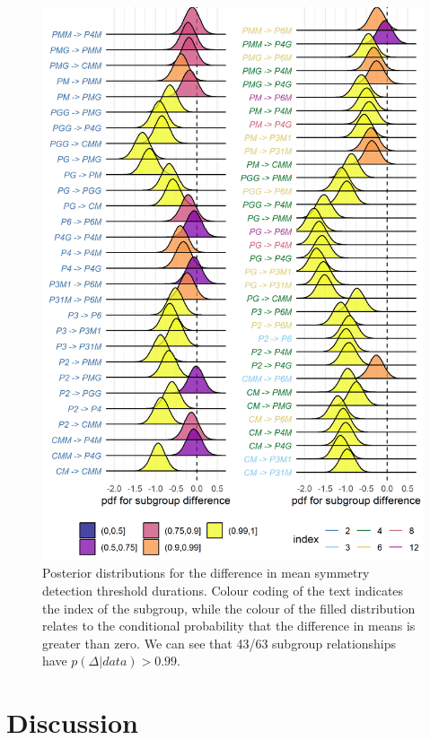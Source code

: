 \documentclass[11pt, twoside]{article}
\begin{document}
\begin{figure}[hptb]
\centering
\includegraphics[width=0.8\linewidth]{../analysis/plots/subgroup_comp_psychophysical.png}
\caption{Posterior distributions for the difference in mean symmetry detection threshold durations. Colour coding of the text indicates the index of the subgroup, while the colour of the filled distribution relates to the conditional probability that the difference in means is greater than zero. We can see that 43/63 subgroup relationships have $p(\Delta|data)>0.99$.}
\label{fig:durations_comp}
\end{figure}

\section*{Discussion}
\end{document}
